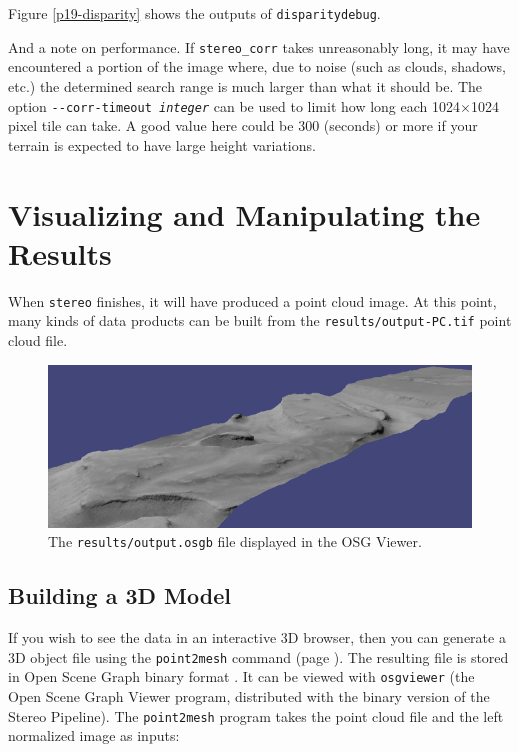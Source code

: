 Figure \ref {p19-disparity} shows the outputs of \texttt{disparitydebug}.

And a note on performance. If \texttt{stereo\_corr} takes unreasonably
long, it may have encountered a portion of the image where, due to noise
(such as clouds, shadows, etc.) the determined search range is much
larger than what it should be. The option \texttt{-\/-corr-timeout \textit{integer}}
can be used to limit how long each 1024$\times$1024 pixel tile can take.
A good value here could be 300 (seconds) or more if your terrain is expected
to have large height variations.

\section{Visualizing and Manipulating the Results}
\label{visualising}

When \texttt{stereo} finishes, it will have produced a point cloud
image.  At this point, many kinds of data products can be built from
the \texttt{results/output-PC.tif} point cloud file.

\begin{figure}[h!]
\begin{minipage}{5in}
\includegraphics[width=5in]{images/p19-osg.png}
\end{minipage}
\hfill
\begin{minipage}{1.7in}
\caption[P19 in OSG]{
    \label{p19-osg}
	The \texttt{results/output.osgb} file displayed in the OSG
        Viewer.}
\end{minipage}
\end{figure}

\subsection{Building a 3D Model}
If you wish to see the data in an interactive 3D browser, then you can
generate a 3D object file using the \texttt{point2mesh} command (page
\pageref{point2mesh}). The resulting file is stored in Open Scene
Graph binary format \cite{OSG_website}.  It can be viewed with
\texttt{osgviewer} (the Open Scene Graph Viewer program, distributed
with the binary version of the Stereo Pipeline).  The
\texttt{point2mesh} program takes the point cloud file and the left
normalized image as inputs:

